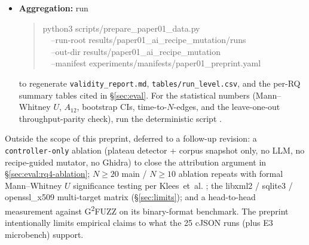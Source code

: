 \documentclass[11pt]{article}
\begin{document}
\begin{itemize}
\begin{quote}
  ~~--ablation no-mutator --budget 14400 \textbackslash{}\\
  ~~--run-id p1\_e2\_cjson\_no-mutator\_r01\\[2pt]
  \# E2c no-static-analysis\\
  python3 -m fuzzpilot.runner --target cjson \textbackslash{}\\
  ~~--ablation no-static-analysis --budget 14400 \textbackslash{}\\
  ~~--run-id p1\_e2\_cjson\_no-static-analysis\_r01
  \end{quote}
  The host-wide orchestrator
  \texttt{scripts/paper01/run\_all\_host.sh\,--parallel\,4}
  iterates the cJSON campaign matrix in 4-way parallel with the same
  per-mode invocations under the hood. The E4 dictionary and cmplog
  fairness runs are included in the checked-in artifact matrix and use
  the corresponding AFL++ launch commands recorded in each
  \texttt{main\_launch.sh}.
  \item \textbf{Aggregation:} run
  \begin{quote}\footnotesize\ttfamily
  python3 scripts/prepare\_paper01\_data.py \\
  ~~--run-root results/paper01\_ai\_recipe\_mutation/runs \\
  ~~--out-dir results/paper01\_ai\_recipe\_mutation \\
  ~~--manifest experiments/manifests/paper01\_preprint.yaml
  \end{quote}
  to regenerate \texttt{validity\_report.md},
  \texttt{tables/run\_level.csv}, and the per-RQ summary tables
  cited in \S\ref{sec:eval}. For the statistical numbers
  (Mann--Whitney $U$, $A_{12}$, bootstrap CIs,
  time-to-$N$-edges, and the leave-one-out throughput-parity
  check), run the deterministic script
  .
\end{itemize}

Outside the scope of this preprint, deferred to a follow-up
revision: a \texttt{controller-only} ablation (plateau detector
+ corpus snapshot only, no LLM, no recipe-guided mutator, no
Ghidra) to close the attribution argument in
\S\ref{sec:eval:rq4-ablation};
$N{\geq}20$ main / $N{\geq}10$ ablation repeats with formal
Mann--Whitney $U$ significance testing per Klees~et~al.
\cite{klees2018evaluating}; the
libxml2 / sqlite3 / openssl\_x509 multi-target matrix
(\S\ref{sec:limits}); and a head-to-head measurement against
G\textsuperscript{2}FUZZ on its binary-format benchmark. The
preprint intentionally limits empirical claims to what the 25
cJSON runs (plus E3 microbench)
support.



\end{document}
